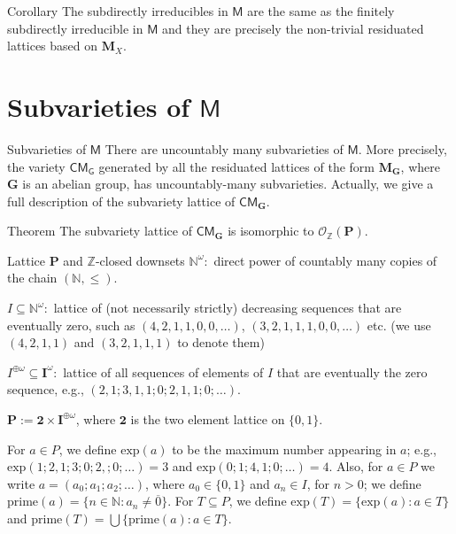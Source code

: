 \documentclass[professionalfont, 12pt]{beamer} %
\theoremstyle{plain}
\theoremstyle{definition}
\newcommand{\m}[1]{{\mathbf {#1} }}
\newcommand{\bb}[1]{\mathbb {#1}}
\begin{document}
\begin{frame}{}
    \begin{block}{Corollary}
        The subdirectly irreducibles in $\mathsf{M}$ are the same as the finitely subdirectly irreducible in $\mathsf{M}$ and they are precisely the non-trivial residuated lattices based on $\mathbf{M}_X$.
    \end{block}
\end{frame}

\section{Subvarieties of \texorpdfstring{$\mathsf{M}$}{M}}

\begin{frame}{Subvarieties of $\mathsf{M}$}
There are uncountably many subvarieties of $\mathsf{M}$. \pause
More precisely, the variety $\mathsf{CM_G}$ generated by all the residuated lattices of the form $\mathbf{M}_{\mathbf{G}}$, where $\mathbf{G}$ is an abelian group, has uncountably-many subvarieties.
Actually, we give a full description of the subvariety lattice of $\mathsf{CM}_{\mathbf{G}}$.

\begin{block}{Theorem}
    The subvariety lattice of $\mathsf{CM}_{\mathbf{G}}$ is isomorphic to $\mathcal{O}_{\mathbb{Z}}(\m P)$.
\end{block}
\end{frame}

\begin{frame}{Lattice $\m P$ and $\bb{Z}$-closed downsets}
    $\bb{N}^\omega:$ direct power of countably many copies of the chain $(\mathbb{N}, \leq)$.
    
    $I \subseteq \bb{N}^\omega:$ lattice of (not necessarily strictly) decreasing sequences that are eventually zero, such as $(4, 2, 1, 1, 0, 0, \dots)$, $(3, 2, 1, 1, 1, 0, 0, \dots)$ etc. (we use $(4, 2, 1, 1)$ and $(3, 2, 1, 1, 1)$ to denote them)
    
    $I^{\oplus \omega} \subseteq \m I^\omega:$ lattice of all sequences of elements of $I$ that are eventually the zero sequence, e.g., $(2, 1; 3, 1, 1; 0; 2, 1, 1; 0; \dots)$.
    
    $\m{P} := \m 2 \times \m I^{\oplus \omega}$, where $\m 2$ is the two element lattice on $\{0,1\}$.\pause
    
    For $a \in P$, we define $\text{exp}(a)$ to be the maximum number appearing in $a$; e.g., $\text{exp}(1; 2, 1; 3; 0; 2,; 0; \dots) = 3$ and $\text{exp}(0; 1; 4, 1; 0; \dots) = 4$.
    Also, for $a \in P$ we write $a = (a_0; a_1; a_2; \ldots)$, where $a_0 \in \{0, 1\}$ and $a_n \in I$, for $n > 0$; we define $\text{prime}(a) = \{n \in \bb{N}: a_n \neq \overline{0}\}$.
    For $T \subseteq P$, we define $\text{exp}(T) = \{\text{exp}(a): a \in T\}$ and $\text{prime}(T) = \bigcup \{\text{prime}(a): a \in T\}$.
\end{frame}
\end{document}
